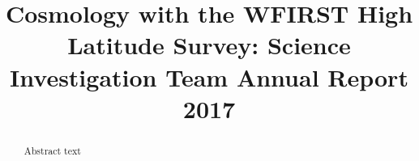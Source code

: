 \documentclass[a4paper]{ar-1col_WFIRST-HLS}
\begin{document}


\cleardoublepage


\title{Cosmology with the WFIRST High Latitude Survey: Science Investigation Team Annual Report 2017}









\begin{abstract}
Abstract text
\end{abstract}



\tableofcontents

\newpage
\end{document}
